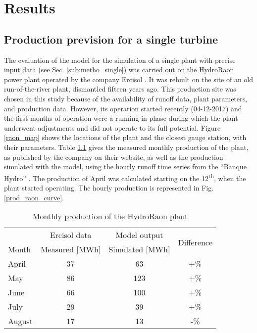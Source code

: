\chapter{Results}
\label{chap:results}
\section{Production prevision for a single turbine}
\label{sec:res_single}

The evaluation of the model for the simulation of a single plant with precise input data (see Sec. \ref{sub:metho_single}) was carried out on the HydroRaon power plant operated by the company Ercisol \cite{ercisol}. It was rebuilt on the site of an old run-of-the-river plant, dismantled fifteen years ago. This production site was chosen in this study because of the availability of runoff data, plant parameters, and production data. However, its operation started recently (04-12-2017) and the first months of operation were a running in phase during which the plant underwent adjustments and did not operate to its full potential. \newline
Figure \ref{raon_map} shows the locations of the plant and the closest gauge station, with their parameters. Table \ref{prod_raon} gives the measured monthly production of the plant, as published by the company on their website, as well as the production simulated with the model, using the hourly runoff time series from the ``Banque Hydro'' \cite{eaufrance}. The production of April was calculated starting on the 12\textsuperscript{th}, when the plant started operating. The hourly production is represented in Fig. \ref{prod_raon_curve}.

\begin{table}[H]
\footnotesize
 \centering
 \caption{Monthly production of the HydroRaon plant}
 \label{prod_raon}
 \begin{tabular}{l|c|c|c|}
  &Ercisol data \cite{ercisol}&Model output&\multirow{2}{*}{Difference}\\
  Month&Measured [MWh]&Simulated [MWh]&\\
  \hline
  April&37&63&+\unit[70]{\%}\\
  May&86&123&+\unit[43]{\%}\\
  June&66&100&+\unit[51]{\%}\\
  July&29&39&+\unit[34]{\%}\\
  August&17&13&-\unit[23]{\%}\\
 \end{tabular}
\end{table}


